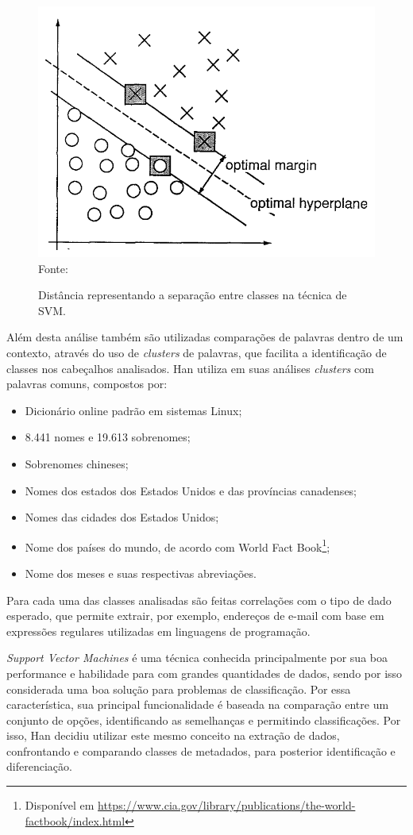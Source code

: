 \begin{figure}
    \centering
    \caption{Distância representando a separação entre classes na técnica de SVM.}
    \includegraphics[width=0.6\linewidth]{./assets/images/svm-graph}
    \center\footnotesize{Fonte: \cite{Vapnik-SVM}}
    \label{fig:svm-graph}
\end{figure}

Além desta análise também são utilizadas comparações de palavras dentro de um contexto, através do uso de \textit{clusters} de palavras, que facilita a identificação de classes nos cabeçalhos analisados. Han \cite{Han-SVM} utiliza em suas análises \textit{clusters} com palavras comuns, compostos por:

\begin{itemize}
    \item Dicionário online padrão em sistemas Linux;
    \item 8.441 nomes e 19.613 sobrenomes;
    \item Sobrenomes chineses;
    \item Nomes dos estados dos Estados Unidos e das províncias canadenses;
    \item Nomes das cidades dos Estados Unidos;
    \item Nome dos países do mundo, de acordo com World Fact Book\footnote{Disponível em \url{https://www.cia.gov/library/publications/the-world-factbook/index.html}};
    \item Nome dos meses e suas respectivas abreviações.
\end{itemize}

Para cada uma das classes analisadas são feitas correlações com o tipo de dado esperado, que permite extrair, por exemplo, endereços de e-mail com base em expressões regulares utilizadas em linguagens de programação.

\emph{Support Vector Machines} é uma técnica conhecida principalmente por sua boa performance e habilidade para com grandes quantidades de dados, sendo por isso considerada uma boa solução para problemas de classificação. Por essa característica, sua principal funcionalidade é baseada na comparação entre um conjunto de opções, identificando as semelhanças e permitindo classificações. Por isso, Han \cite{Han-SVM} decidiu utilizar este mesmo conceito na extração de dados, confrontando e comparando classes de metadados, para posterior identificação e diferenciação.

